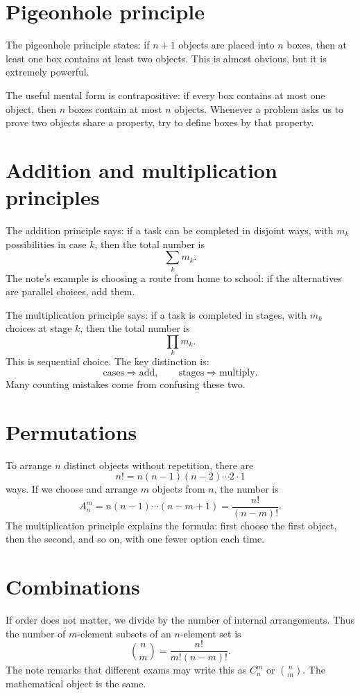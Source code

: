 \section{Pigeonhole principle}

The pigeonhole principle states: if \(n+1\) objects are placed into \(n\) boxes, then at least one box contains at least two objects.  This is almost obvious, but it is extremely powerful.

The useful mental form is contrapositive: if every box contains at most one object, then \(n\) boxes contain at most \(n\) objects.  Whenever a problem asks us to prove two objects share a property, try to define boxes by that property.

\section{Addition and multiplication principles}

The addition principle says: if a task can be completed in disjoint ways, with \(m_k\) possibilities in case \(k\), then the total number is
\[
  \sum_k m_k.
\]
The note's example is choosing a route from home to school: if the alternatives are parallel choices, add them.

The multiplication principle says: if a task is completed in stages, with \(m_k\) choices at stage \(k\), then the total number is
\[
  \prod_k m_k.
\]
This is sequential choice.  The key distinction is:
\[
  \text{cases}\Rightarrow\text{add},\qquad
  \text{stages}\Rightarrow\text{multiply}.
\]
Many counting mistakes come from confusing these two.

\section{Permutations}

To arrange \(n\) distinct objects without repetition, there are
\[
  n!=n(n-1)(n-2)\cdots2\cdot1
\]
ways.  If we choose and arrange \(m\) objects from \(n\), the number is
\[
  A_n^m=n(n-1)\cdots(n-m+1)=\frac{n!}{(n-m)!}.
\]
The multiplication principle explains the formula: first choose the first object, then the second, and so on, with one fewer option each time.

\section{Combinations}

If order does not matter, we divide by the number of internal arrangements.  Thus the number of \(m\)-element subsets of an \(n\)-element set is
\[
  \binom nm=\frac{n!}{m!(n-m)!}.
\]
The note remarks that different exams may write this as \(C_n^m\) or \(\binom nm\).  The mathematical object is the same.

